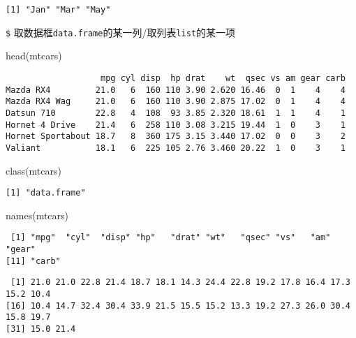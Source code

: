 \documentclass[
  letterpaper,
  DIV=11,
  numbers=noendperiod]{scrreprt}
\newenvironment{Shaded}{\begin{snugshade}}{\end{snugshade}}
\newcommand{\FunctionTok}[1]{\textcolor[rgb]{0.28,0.35,0.67}{#1}}
\newcommand{\NormalTok}[1]{\textcolor[rgb]{0.00,0.23,0.31}{#1}}
\newcommand{\SpecialCharTok}[1]{\textcolor[rgb]{0.37,0.37,0.37}{#1}}
\begin{document}
\begin{verbatim}
[1] "Jan" "Mar" "May"
\end{verbatim}

\texttt{\$}
取数据框\texttt{data.frame}的某一列/取列表\texttt{list}的某一项

\begin{Shaded}
\begin{Highlighting}[]
\FunctionTok{head}\NormalTok{(mtcars)}
\end{Highlighting}
\end{Shaded}

\begin{verbatim}
                   mpg cyl disp  hp drat    wt  qsec vs am gear carb
Mazda RX4         21.0   6  160 110 3.90 2.620 16.46  0  1    4    4
Mazda RX4 Wag     21.0   6  160 110 3.90 2.875 17.02  0  1    4    4
Datsun 710        22.8   4  108  93 3.85 2.320 18.61  1  1    4    1
Hornet 4 Drive    21.4   6  258 110 3.08 3.215 19.44  1  0    3    1
Hornet Sportabout 18.7   8  360 175 3.15 3.440 17.02  0  0    3    2
Valiant           18.1   6  225 105 2.76 3.460 20.22  1  0    3    1
\end{verbatim}

\begin{Shaded}
\begin{Highlighting}[]
\FunctionTok{class}\NormalTok{(mtcars)}
\end{Highlighting}
\end{Shaded}

\begin{verbatim}
[1] "data.frame"
\end{verbatim}

\begin{Shaded}
\begin{Highlighting}[]
\FunctionTok{names}\NormalTok{(mtcars)}
\end{Highlighting}
\end{Shaded}

\begin{verbatim}
 [1] "mpg"  "cyl"  "disp" "hp"   "drat" "wt"   "qsec" "vs"   "am"   "gear"
[11] "carb"
\end{verbatim}

\begin{Shaded}
\end{Shaded}

\begin{verbatim}
 [1] 21.0 21.0 22.8 21.4 18.7 18.1 14.3 24.4 22.8 19.2 17.8 16.4 17.3 15.2 10.4
[16] 10.4 14.7 32.4 30.4 33.9 21.5 15.5 15.2 13.3 19.2 27.3 26.0 30.4 15.8 19.7
[31] 15.0 21.4
\end{verbatim}
\end{document}
